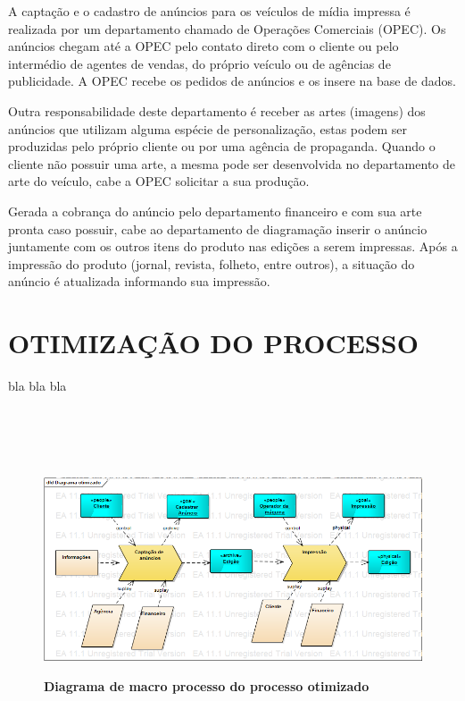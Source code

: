 \documentclass[
	12pt,				%
	openright,			%
	oneside,			%
	a4paper,			%
	chapter=TITLE,		%
	section=TITLE,		%
	english,			%
	french,				%
	spanish,			%
	brazil				%
	]{abntex2}
\begin{document}
A captação e o cadastro de anúncios para os veículos de mídia impressa é realizada por um departamento chamado de Operações Comerciais (OPEC). Os anúncios chegam até a OPEC pelo contato direto com o cliente ou pelo intermédio de agentes de vendas, do próprio veículo ou de agências de publicidade. A OPEC recebe os pedidos de anúncios e os insere na base de dados.

Outra responsabilidade deste departamento é receber as artes (imagens) dos anúncios que utilizam alguma espécie de personalização, estas podem ser produzidas pelo próprio cliente ou por uma agência de propaganda. Quando o cliente não possuir uma arte, a mesma pode ser desenvolvida no departamento de arte do veículo, cabe a OPEC solicitar a sua produção.

Gerada a cobrança do anúncio pelo departamento financeiro e com sua arte pronta caso possuir, cabe ao departamento de diagramação inserir o anúncio juntamente com os outros itens do produto nas edições a serem impressas. Após a impressão do produto (jornal, revista, folheto, entre outros), a situação do anúncio é atualizada informando sua impressão.

\section{OTIMIZAÇÃO DO PROCESSO}
bla bla bla \\ \\ \\ \\ \\

\begin{figure}[htb]
	\begin{center}
		\caption{
			\textbf{Diagrama de macro processo do processo otimizado}
		}\label{fig-diag-macroprocesso-otimizado}
		\includegraphics [scale=0.5]{imagens/diagrama_macro_processo_otimizado.png}
		\label{fig-diag-macroprocesso-otimizado}
	\end{center}
\end{figure}
\end{document}
